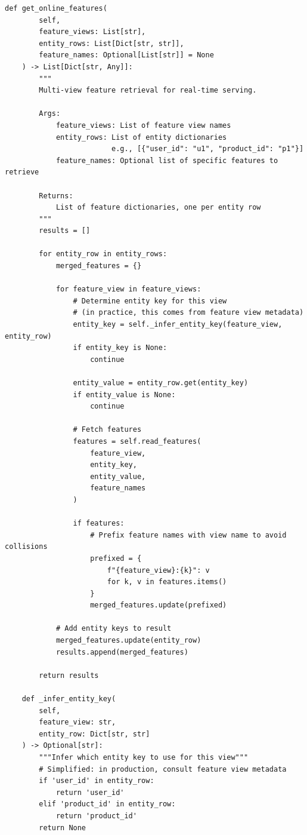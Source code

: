 \begin{lstlisting}[style=python, caption=Low-latency online feature store implementation]
    def get_online_features(
        self,
        feature_views: List[str],
        entity_rows: List[Dict[str, str]],
        feature_names: Optional[List[str]] = None
    ) -> List[Dict[str, Any]]:
        """
        Multi-view feature retrieval for real-time serving.

        Args:
            feature_views: List of feature view names
            entity_rows: List of entity dictionaries
                         e.g., [{"user_id": "u1", "product_id": "p1"}]
            feature_names: Optional list of specific features to retrieve

        Returns:
            List of feature dictionaries, one per entity row
        """
        results = []

        for entity_row in entity_rows:
            merged_features = {}

            for feature_view in feature_views:
                # Determine entity key for this view
                # (in practice, this comes from feature view metadata)
                entity_key = self._infer_entity_key(feature_view, entity_row)
                if entity_key is None:
                    continue

                entity_value = entity_row.get(entity_key)
                if entity_value is None:
                    continue

                # Fetch features
                features = self.read_features(
                    feature_view,
                    entity_key,
                    entity_value,
                    feature_names
                )

                if features:
                    # Prefix feature names with view name to avoid collisions
                    prefixed = {
                        f"{feature_view}:{k}": v
                        for k, v in features.items()
                    }
                    merged_features.update(prefixed)

            # Add entity keys to result
            merged_features.update(entity_row)
            results.append(merged_features)

        return results

    def _infer_entity_key(
        self,
        feature_view: str,
        entity_row: Dict[str, str]
    ) -> Optional[str]:
        """Infer which entity key to use for this view"""
        # Simplified: in production, consult feature view metadata
        if 'user_id' in entity_row:
            return 'user_id'
        elif 'product_id' in entity_row:
            return 'product_id'
        return None


\end{lstlisting}
